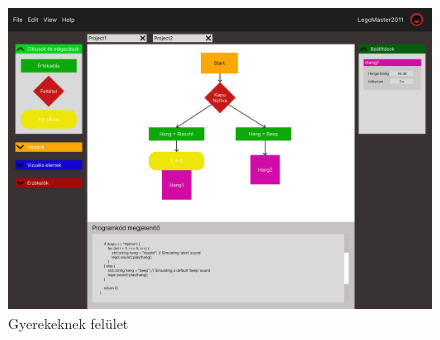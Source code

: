 \documentclass{article}
\begin{document}
\begin{figure}[H]
\centering
\includegraphics[width=1\linewidth]{gyerekeknek-felulet.png}
\caption{\label{fig:image}Gyerekeknek felület}
\end{figure}
\end{document}
